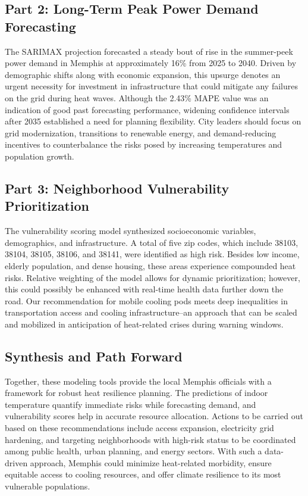 \documentclass[12pt]{article}
\begin{document}
\subsection{Part 2: Long-Term Peak Power Demand Forecasting}
The SARIMAX projection forecasted a steady bout of rise in the summer-peek power demand in Memphis at approximately 16\% from 2025 to 2040. Driven by demographic shifts along with economic expansion, this upsurge denotes an urgent necessity for investment in infrastructure that could mitigate any failures on the grid during heat waves. Although the 2.43\% MAPE value was an indication of good past forecasting performance, widening confidence intervals after 2035 established a need for planning flexibility. City leaders should focus on grid modernization, transitions to renewable energy, and demand-reducing incentives to counterbalance the risks posed by increasing temperatures and population growth. 
\subsection{Part 3: Neighborhood Vulnerability Prioritization}
The vulnerability scoring model synthesized socioeconomic variables, demographics, and infrastructure. A total of five zip codes, which include 38103, 38104, 38105, 38106, and 38141, were identified as high risk. Besides low income, elderly population, and dense housing, these areas experience compounded heat risks. Relative weighting of the model allows for dynamic prioritization; however, this could possibly be enhanced with real-time health data further down the road. Our recommendation for mobile cooling pods meets deep inequalities in transportation access and cooling infrastructure--an approach that can be scaled and mobilized in anticipation of heat-related crises during warning windows. 

\subsection{Synthesis and Path Forward}
Together, these modeling tools provide the local Memphis officials with a framework for robust heat resilience planning. The predictions of indoor temperature quantify immediate risks while forecasting demand, and vulnerability scores help in accurate resource allocation. Actions to be carried out based on these recommendations include access expansion, electricity grid hardening, and targeting neighborhoods with high-risk status to be coordinated among public health, urban planning, and energy sectors. With such a data-driven approach, Memphis could minimize heat-related morbidity, ensure equitable access to cooling resources, and offer climate resilience to its most vulnerable populations. 
\end{document}
